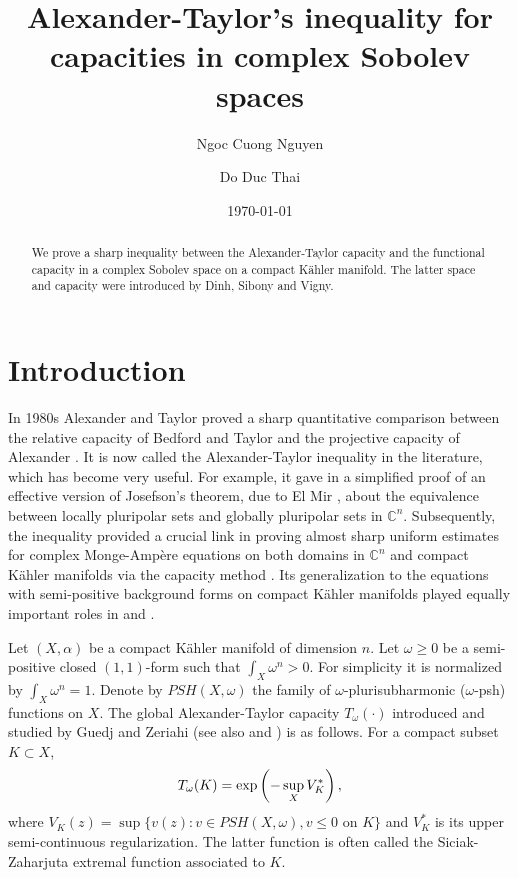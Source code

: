 \documentclass{amsart}
\title[Alexander-Taylor's inequality in complex Sobolev spaces]{Alexander-Taylor's inequality for capacities in complex Sobolev spaces}
\author{Ngoc Cuong Nguyen}
\date{\today}
\author{Do Duc Thai}
\newcommand{\al}{\alpha}
\newcommand{\om}{\omega}
\newcommand{\bC}{\mathbb{C}}
\theoremstyle{definition}
\numberwithin{thm}{section}
\numberwithin{equation}{section}
\renewcommand{\[}{\begin{equation}}
\renewcommand{\]}{\end{equation}}
\begin{document}
\maketitle

\begin{abstract}  We prove a sharp inequality between the Alexander-Taylor capacity and  the functional capacity in a complex Sobolev space on a compact K\"ahler manifold. The latter space and capacity were introduced   by Dinh, Sibony and Vigny.
\end{abstract}


\section{Introduction}
 
 In 1980s Alexander and Taylor \cite{AT84} proved a sharp quantitative comparison between  the relative capacity of  Bedford and Taylor \cite{BT82}  and the projective capacity of Alexander \cite{A79}. It  is now called the Alexander-Taylor inequality in the literature, which has become very useful. For example,  it gave in \cite{AT84} a simplified proof of an effective version  of Josefson's theorem, due to El Mir \cite{EM79},  about the equivalence between locally pluripolar sets and globally pluripolar sets in $\bC^n$. Subsequently, the  inequality provided a crucial link in proving almost sharp uniform estimates for complex Monge-Amp\`ere equations on both domains in $\bC^n$ and compact K\"ahler manifolds  via the capacity method \cite{Ko98, Ko05}. Its generalization to the equations with semi-positive background forms on compact K\"ahler manifolds  played equally important roles in \cite{GZ05, GZ-book} and \cite{EGZ09}.

Let $(X,\al)$ be a compact K\"ahler manifold of dimension $n$. Let $\om\geq 0$ be a semi-positive closed $(1,1)$-form such that $\int_X \om^n>0$. For simplicity it is normalized by $\int_X \om^n=1$. Denote by $PSH(X,\om)$ the family of $\om$-plurisubharmonic ($\om$-psh) functions on $X$. 
The global Alexander-Taylor capacity $T_\om(\cdot)$ introduced and studied by Guedj and Zeriahi \cite{GZ05}  (see also \cite{DS06b} and \cite{GZ-book}) is as follows. For a compact subset $K\subset X$,
\[ \notag\label{eq:AT-cap-intro}
	T_\om (K) = \exp \left( - \sup_X V_K^* \right),
\]
where 
$\label{eq:SZ-intro}
	V_K(z) = \sup\{v(z): v\in PSH(X,\om), v\leq 0 \text{ on }K\}
$
and $V_K^*$ is its upper semi-continuous regularization. The latter function is often  called the Siciak-Zaharjuta extremal function associated to $K$. 
  
\end{document}
